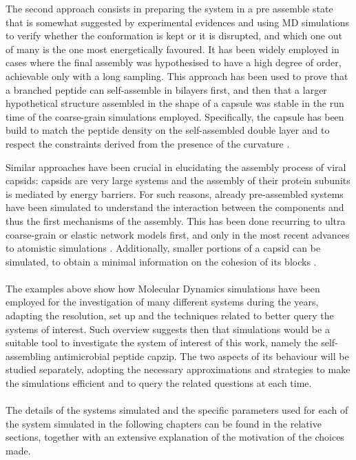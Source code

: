 The second approach consists in preparing the system in a pre assemble state that is somewhat suggested by experimental evidences and using MD simulations to verify whether the conformation is kept or it is disrupted, and which one out of many is the one most energetically favoured. It has been widely employed in cases where the final assembly was hypothesised to have a high degree of order, achievable only with a long sampling. 
%
This approach has been used to prove that a branched peptide can self-assemble in bilayers first, and then that a larger hypothetical structure assembled in the shape of a capsule was stable in the run time of the coarse-grain simulations employed. Specifically, the capsule has been build to match the peptide density on the self-assembled double layer and to respect the constraints derived from the presence of the curvature \citep{Gudlur2012}.

Similar approaches have been crucial in elucidating the assembly process of viral capsids: capsids are very large systems and the assembly of their protein subunits is mediated by energy barriers. For such reasons, already pre-assembled systems have been simulated to understand the interaction between the components and thus the first mechanisms of the assembly. This has been done recurring to ultra coarse-grain or elastic network models \citep{Grime2016} first, and only in the most recent advances to atomistic simulations \citep{Perilla2016,Hadden2018}. Additionally, smaller portions of a capsid can be simulated, to obtain a minimal information on the cohesion of its blocks \citep{AbiMansour2014}.


\paragraph{}
The examples above show how Molecular Dynamics simulations have been employed for the investigation of many different systems during the years, adapting the resolution, set up and the techniques related to better query the systems of interest. Such overview suggests then that simulations would be a suitable tool to investigate the system of interest of this work, namely the self-assembling antimicrobial peptide capzip. The two aspects of its behaviour will be studied separately, adopting the necessary approximations and strategies to make the simulations efficient and to query the related questions at each time.

\paragraph{}
The details of the systems simulated and the specific parameters used for each of the system simulated in the following chapters can be found in the relative sections, together with an extensive explanation of the motivation of the choices made.